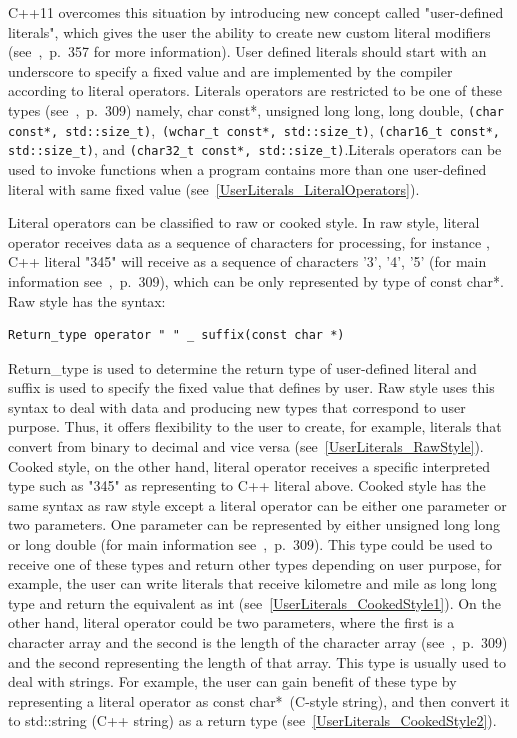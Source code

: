 \documentclass[11pt]{report}
\begin{document}
C++11 overcomes this situation by introducing new concept called "user-defined literals", which gives the user the ability to create new custom literal modifiers (see~\cite{Overland:2011:CWF},~p.~357 for more information). User defined literals should start with an underscore to specify a fixed value and are implemented by the compiler according to literal operators. Literals operators are restricted to be one of these types (see~\cite{Gregorie:professionalcpp},~p.~309) namely, char const*, unsigned long long, long double, \texttt{(char const*, std::size\_t)},~\texttt{(wchar\_t const*, std::size\_t)}, \texttt{(char16\_t const*, std::size\_t)}, and \texttt{(char32\_t const*, std::size\_t)}.\linebreak Literals operators can be used to invoke functions when a program contains more than one user-defined literal with same fixed value (see~\ref{UserLiterals_LiteralOperators}).

Literal operators can be classified to raw or cooked style. In raw style, literal operator receives data as a sequence of characters for processing, for instance , C++ literal "345" will receive as a sequence of characters '3', '4', '5' (for main information see~\cite{Gregorie:professionalcpp},~p.~309), which can be only represented by type of  const char*. Raw style has the syntax:
\begin{lstlisting}
Return_type operator " " _ suffix(const char *)
\end{lstlisting}

Return\_type is used to determine the return type of user-defined literal and suffix is used to specify the fixed value that defines by user. Raw style uses this syntax to deal with data and producing new types that correspond to user purpose. Thus, it offers flexibility to the user to create, for example, literals that convert from binary to decimal and vice versa (see~\ref{UserLiterals_RawStyle}). Cooked style, on the other hand, literal operator receives a specific interpreted type such as "345" as representing to C++ literal above. Cooked style has the same syntax as raw style except a literal operator can be either one parameter or two parameters. One parameter can be represented by either unsigned long long or long double (for main information see~\cite{Gregorie:professionalcpp},~p.~309). This type could be used to receive one of these types and return other types depending on user purpose, for example, the user can write literals that receive kilometre and mile as long long type and return the equivalent as int (see~\ref{UserLiterals_CookedStyle1}). On the other hand, literal operator could be two parameters, where the first is a character array and the second is the length of the character array (see~\cite{Gregorie:professionalcpp},~p.~309) and the second representing the length of that array. This type is usually used to deal with strings. For example, the user can gain benefit of these type by representing a literal operator as const char*~(C-style string), and then convert it to std::string (C++ string) as a return type (see~\ref{UserLiterals_CookedStyle2}).
\end{document}
